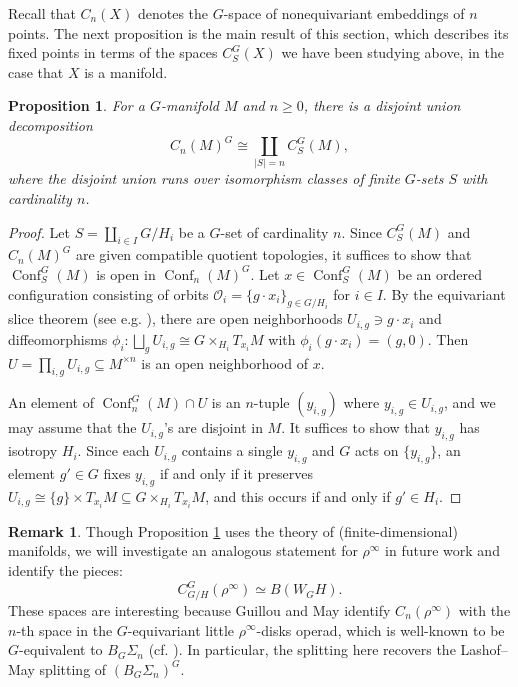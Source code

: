 \documentclass[11pt]{amsart}
\newtheorem{proposition}[equation]{Proposition}
\theoremstyle{definition}
\newtheorem{remark}[equation]{Remark}
\numberwithin{equation}{subsection} %
\newcommand{\Conf}{\operatorname{Conf}}
\newcommand{\x}{\times}
\newcommand{\hteq}{\simeq}
\newcommand{\ints}{\cap}
\begin{document}

Recall that $C_n(X)$ denotes the $G$-space of nonequivariant embeddings of $n$
points. The next proposition is the main result of this section, which describes
its fixed points in terms of the spaces $C_S^G(X)$ we have been studying above,
in the case that $X$ is a manifold.

\begin{proposition}\label{Prop:FixptConfDecomp}
For a $G$-manifold $M$ and $n\geq 0$, there is a disjoint union decomposition
$$ C_n(M)^G \cong \coprod_{|S|=n} C^G_S(M), $$
where the disjoint union runs over isomorphism classes of finite $G$-sets $S$ with cardinality $n$.
\end{proposition}

\begin{proof}
Let $S = \coprod_{i\in I} G/H_i$ be a $G$-set of cardinality $n$.
Since $C_S^G(M)$ and $C_n(M)^G$ are given compatible quotient topologies, it
suffices to show that $\Conf_S^G(M)$ is open in $\Conf_n(M)^G$.
Let $x\in \Conf_S^G(M)$ be an ordered configuration consisting of orbits
$\mathcal{O}_i= \{ g\cdot x_i \}_{g\in G/H_i}$ for $i\in I$.
By the equivariant slice theorem (see e.g. \cite[Theorem I.2.1.1]{audin}),
there are open neighborhoods $U_{i,g}\ni g\cdot x_i$
and diffeomorphisms $\phi_i:\bigsqcup_g U_{i,g} \cong G\x_{H_i} T_{x_i}M$ with
$\phi_i(g\cdot x_i)= (g, 0)$. Then $U = \prod_{i,g}
U_{i,g}\subseteq M^{\x n}$ is an open neighborhood of $x$.

An element of $\Conf_n^G(M)\ints U$ is an $n$-tuple $(y_{i,g})$ where
$y_{i,g}\in U_{i,g}$, and
we may assume that the $U_{i,g}$'s are disjoint in $M$.
It suffices to show that $y_{i,g}$ has isotropy $H_i$.
Since each $U_{i,g}$ contains a single $y_{i,g}$ and $G$ acts on $\{ y_{i,g} \}$,
an element $g'\in G$ fixes $y_{i,g}$ if and only if it preserves $U_{i,g}\cong
\{ g \}\x T_{x_i}M \subseteq G\x_{H_i} T_{x_i}M$, and this occurs if and only if $g'\in H_i$.
\end{proof}

\begin{remark}
Though Proposition \ref{Prop:FixptConfDecomp} uses the theory of
(finite-dimensional) manifolds, we will investigate an analogous statement for $\rho^\infty$ in future work
and identify the pieces:
\begin{equation}\label{eq:rho-infty} C^G_{G/H}(\rho^\infty)\hteq B(W_GH). \end{equation}
These spaces are interesting because
Guillou and May \cite[Lem. 1.2]{GM17} identify $C_n(\rho^\infty)$ with the $n$-th
space in the $G$-equivariant little $\rho^\infty$-disks operad, which is
well-known to be $G$-equivalent to $B_G\Sigma_n$ (cf. \cite[Pg. 489]{CW91}).
In particular, the splitting here recovers the Lashof--May splitting
\cite[Theorem VII.2.7]{May96} of $(B_G\Sigma_n)^G$.
\end{remark}
\end{document}
